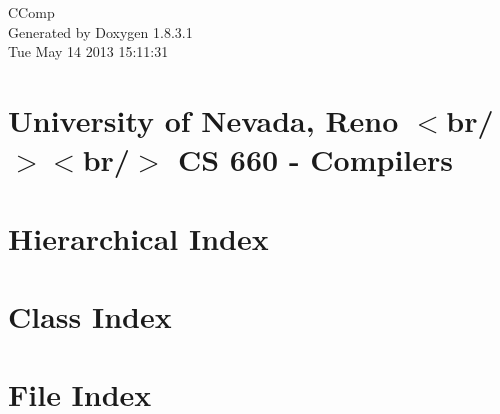 \documentclass{book}
\begin{document}
\hypersetup{pageanchor=false,citecolor=blue}
\begin{titlepage}
\vspace*{7cm}
\begin{center}
{\Large C\-Comp }\\
\vspace*{1cm}
{\large Generated by Doxygen 1.8.3.1}\\
\vspace*{0.5cm}
{\small Tue May 14 2013 15:11:31}\\
\end{center}
\end{titlepage}
\clearemptydoublepage
{}
\tableofcontents
\clearemptydoublepage
{}
\hypersetup{pageanchor=true,citecolor=blue}
\chapter{University of Nevada, Reno $<$br/$>$$<$br/$>$ C\-S 660 -\/ Compilers}
\label{index}\hypertarget{index}{}
\chapter{Hierarchical Index}

\chapter{Class Index}

\chapter{File Index}

\end{document}
